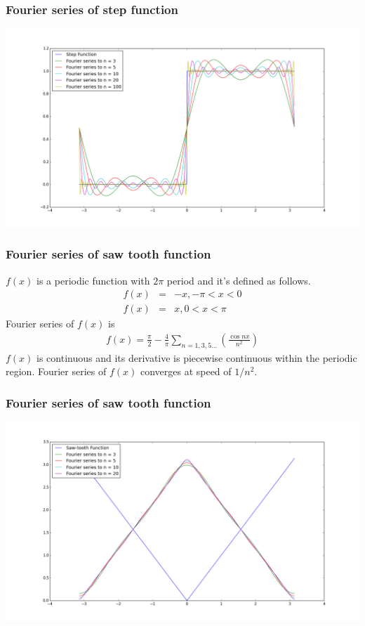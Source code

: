 \documentclass{beamer}
\begin{document}
\begin{frame}
\frametitle{Fourier series of step function}
\includegraphics[scale=0.3]{step.png}
\end{frame}
\begin{frame}
\frametitle{Fourier series of saw tooth function}
$f(x)$ is a periodic function with $2\pi$ period and it's defined as follows.
\begin{eqnarray}
f(x)&=& -x, -\pi < x < 0 \nonumber \\
f(x)&=& x, 0 < x < \pi
\label{eq:sawfunc}
\end{eqnarray}
Fourier series of $f(x)$ is
\begin{eqnarray}
f(x)= \frac{\pi}{2} - \frac{4}{\pi} \sum_{n=1,3,5...} \left( \frac{\cos nx}{n^2} \right)
\label{eq:sawfunc_ft}
\end{eqnarray}
$f(x)$ is continuous and its derivative is piecewise continuous within the periodic region. Fourier series of $f(x)$ converges at speed of $1/n^2$.
\end{frame}
\begin{frame}
\frametitle{Fourier series of saw tooth function}
\includegraphics[scale=0.3]{sawtooth.png}
\end{frame}
\end{document}
